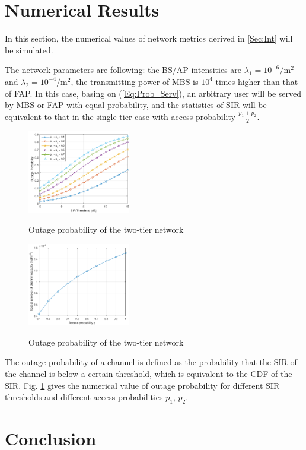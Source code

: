 \documentclass[a4paper,twocolumn]{IEEEtran}
\begin{document}
\section{Numerical Results}\label{Sec:Num}
In this section, the numerical values of network metrics derived in \ref{Sec:Int} will be simulated.

The network parameters are following: the BS/AP intensities are $\lambda_1 = 10^{-6} /\text{m}^2$ and $\lambda_2 = 10^{-4} /\text{m}^2$, the transmitting power of MBS is $10^4$ times higher than that of FAP. In this case, basing on (\ref{Eq:Prob_Serv}), an arbitrary user will be served by MBS or FAP with equal probability, and the statistics of SIR will be equivalent to that in the single tier case with access probability $\frac{p_1+p_2}{2}$.

\begin{figure}[t]
	\centering
	\includegraphics[width = 0.4\textwidth]{figure/Outage_cropped}
	\label{Fig:Outage}
	\caption{Outage probability of the two-tier network}
\end{figure}

\begin{figure}[t]
	\centering
	\includegraphics[width = 0.4\textwidth]{figure/Capacity_cropped}
	\label{Fig:Capacity}
	\caption{Outage probability of the two-tier network}
\end{figure}

The outage probability of a channel is defined as the probability that the SIR of the channel is below a certain threshold, which is equivalent to the CDF of the SIR. Fig. \ref{Fig:Outage} gives the numerical value of outage probability for different SIR thresholds and different access probabilities $p_1$, $p_2$. 
\section{Conclusion}\label{Sec:Con}

  
\end{document}
